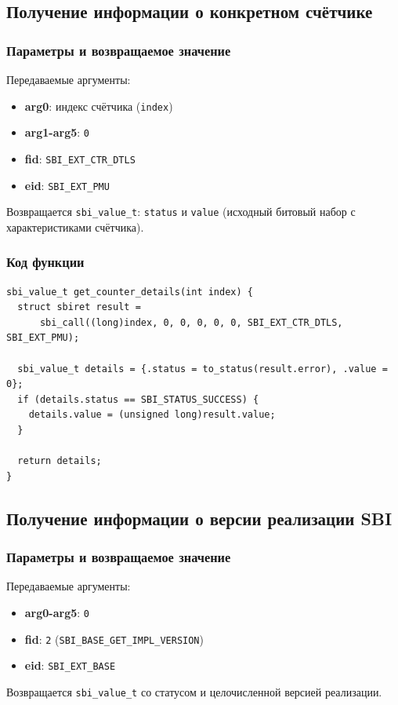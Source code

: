 \documentclass[12pt,a4paper]{report}
\begin{document}
\subsection*{Получение информации о конкретном счётчике}
\subsubsection*{Параметры и возвращаемое значение}
Передаваемые аргументы:
\begin{itemize}
    \item \textbf{arg0}: индекс счётчика (\texttt{index})
    \item \textbf{arg1-arg5}: \texttt{0}
    \item \textbf{fid}: \texttt{SBI\_EXT\_CTR\_DTLS}
    \item \textbf{eid}: \texttt{SBI\_EXT\_PMU}
\end{itemize}
Возвращается
\texttt{sbi\_value\_t}: \texttt{status} и \texttt{value} (исходный битовый набор
с характеристиками счётчика).
\subsubsection*{Код функции}
\begin{verbatim}
sbi_value_t get_counter_details(int index) {
  struct sbiret result =
      sbi_call((long)index, 0, 0, 0, 0, 0, SBI_EXT_CTR_DTLS, SBI_EXT_PMU);

  sbi_value_t details = {.status = to_status(result.error), .value = 0};
  if (details.status == SBI_STATUS_SUCCESS) {
    details.value = (unsigned long)result.value;
  }

  return details;
}
\end{verbatim}

\subsection*{Получение информации о версии реализации SBI}
\subsubsection*{Параметры и возвращаемое значение}
Передаваемые аргументы:
\begin{itemize}
    \item \textbf{arg0-arg5}: \texttt{0}
    \item \textbf{fid}: \texttt{2} (\texttt{SBI\_BASE\_GET\_IMPL\_VERSION})
    \item \textbf{eid}: \texttt{SBI\_EXT\_BASE}
\end{itemize}
Возвращается \texttt{sbi\_value\_t}
со статусом и целочисленной версией реализации.
\end{document}
